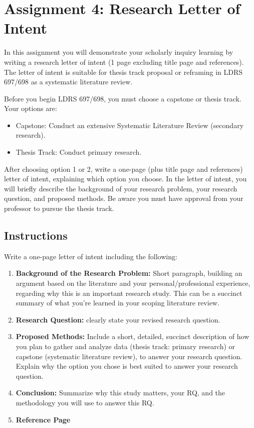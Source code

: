 \documentclass[
  letterpaper,
  DIV=11,
  numbers=noendperiod]{scrreprt}
\providecommand{\tightlist}{%
  \setlength{\itemsep}{0pt}\setlength{\parskip}{0pt}}\usepackage{longtable,booktabs,array}
\begin{document}

\chapter{Assignment 4: Research Letter of
Intent}\label{assignment-4-research-letter-of-intent}

In this assignment you will demonstrate your scholarly inquiry learning
by writing a research letter of intent (1 page excluding title page and
references). The letter of intent is suitable for thesis track proposal
or reframing in LDRS 697/698 as a systematic literature review.

Before you begin LDRS 697/698, you must choose a capstone or thesis
track. Your options are:

\begin{itemize}
\tightlist
\item
  Capstone: Conduct an extensive Systematic Literature Review (secondary
  research).
\item
  Thesis Track: Conduct primary research.
\end{itemize}

After choosing option 1 or 2, write a one-page (plus title page and
references) letter of intent, explaining which option you choose. In the
letter of intent, you will briefly describe the background of your
research problem, your research question, and proposed methods. Be aware
you must have approval from your professor to pursue the thesis track.

\section{Instructions}\label{instructions-7}

Write a one-page letter of intent including the following:

\begin{enumerate}
\def\labelenumi{\arabic{enumi}.}
\tightlist
\item
  \textbf{Background of the Research Problem:} Short paragraph, building
  an argument based on the literature and your personal/professional
  experience, regarding why this is an important research study. This
  can be a succinct summary of what you're learned in your scoping
  literature review.
\item
  \textbf{Research Question:} clearly state your revised research
  question.
\item
  \textbf{Proposed Methods:} Include a short, detailed, succinct
  description of how you plan to gather and analyze data (thesis track:
  primary research) or capstone (systematic literature review), to
  answer your research question. Explain why the option you chose is
  best suited to answer your research question.
\item
  \textbf{Conclusion:} Summarize why this study matters, your RQ, and
  the methodology you will use to answer this RQ.
\item
  \textbf{Reference Page}
\end{enumerate}
\end{document}
